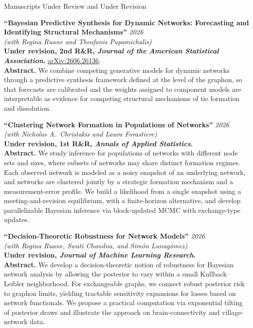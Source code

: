 \documentclass{resume}
\newcommand*{\myhref}[2]{\href{#1}{#2}}
\newcommand{\pubtitle}[1]{\textbf{``#1''}}
\begin{document}
\begin{rSection}{Manuscripts Under Review and Under Revision}

\pubtitle{Bayesian Predictive Synthesis for Dynamic Networks: Forecasting and Identifying Structural Mechanisms} \hfill {\em 2026}\\
\textit{(with Regina Ruane and Theofanis Papamichalis)}\\
{\small \textbf{Under revision, 2nd R\&R, \emph{Journal of the American Statistical Association}.} \myhref{https://arxiv.org/abs/2606.26136}{arXiv:2606.26136}.}\\
{\small \textbf{Abstract.} We combine competing generative models for dynamic networks through a predictive synthesis framework defined at the level of the graphon, so that forecasts are calibrated and the weights assigned to component models are interpretable as evidence for competing structural mechanisms of tie formation and dissolution.}

\pubtitle{Clustering Network Formation in Populations of Networks} \hfill {\em 2026}\\
\textit{(with Nicholas A.\ Christakis and Laura Forastiere)}\\
{\small \textbf{Under revision, 1st R\&R, \emph{Annals of Applied Statistics}.}}\\
{\small \textbf{Abstract.} We study inference for populations of networks with different node sets and sizes, where subsets of networks may share distinct formation regimes. Each observed network is modeled as a noisy snapshot of an underlying network, and networks are clustered jointly by a strategic formation mechanism and a measurement-error profile. We build a likelihood from a single snapshot using a meeting-and-revision equilibrium, with a finite-horizon alternative, and develop parallelizable Bayesian inference via block-updated MCMC with exchange-type updates.}

\pubtitle{Decision-Theoretic Robustness for Network Models} \hfill {\em 2026}\\
\textit{(with Regina Ruane, Swati Chandna, and Sim\'on Lunag\'omez)}\\
{\small \textbf{Under revision, \emph{Journal of Machine Learning Research}.}}\\
{\small \textbf{Abstract.} We develop a decision-theoretic notion of robustness for Bayesian network analysis by allowing the posterior to vary within a small Kullback--Leibler neighborhood. For exchangeable graphs, we connect robust posterior risk to graphon limits, yielding tractable sensitivity expansions for losses based on network functionals. We propose a practical computation via exponential tilting of posterior draws and illustrate the approach on brain-connectivity and village-network data.}


\end{rSection}
\end{document}
